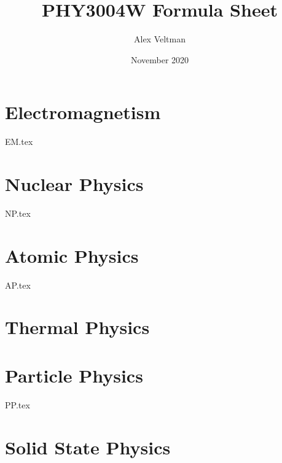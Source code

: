 \documentclass[a4paper, twocolumn]{article}
\title{PHY3004W Formula Sheet}
\author{Alex Veltman}
\date{November 2020}
\makeatletter
\numberwithin{equation}{section}
\renewcommand{\maketitle} %
{ \begingroup \vskip 10pt \begin{center} \large {\bf \@title}
	\vskip 10pt \large \@author \hskip 20pt \@date \end{center}
  \vskip 10pt \endgroup \setcounter{footnote}{0} }
\makeatother
\begin{document}
\maketitle

\section{Electromagnetism}
{EM.tex}

\section{Nuclear Physics}
{NP.tex}

\section{Atomic Physics}
{AP.tex}

\section{Thermal Physics}

\section{Particle Physics}
{PP.tex}

\section{Solid State Physics}
\end{document}
